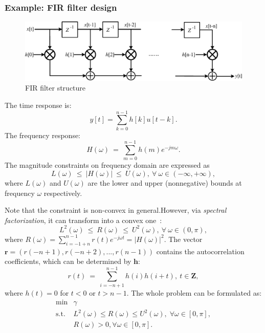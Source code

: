 \documentclass[final,leqno]{siamltex}
\begin{document}
\hypertarget{sec:example-fir-filter-design}{%
\subsubsection{Example: FIR filter design}\label{sec:example-fir-filter-design}}

\begin{figure}
\hypertarget{fig:fir_strctr}{%
\centering
\includegraphics{ellipsoid.files/fir_strctr.pdf}
\caption{FIR filter structure}\label{fig:fir_strctr}
}
\end{figure}

The time response is:
\[ y[t] = \sum_{k=0}^{n-1}{h[k]u[t-k]}.\]
The frequency response:
\[ H(\omega)~=~\sum_{m=0}^{n-1}{h(m)e^{-jm\omega}}.\]
The magnitude constraints on frequency domain are expressed as
\[ L(\omega)~\leq~|H(\omega)|~\leq~U(\omega),~\forall~\omega\in(-\infty,+\infty),\]
where \(L(\omega)\) and \(U(\omega)\) are the lower and upper (nonnegative) bounds at frequency \(\omega\) respectively.

Note that the constraint is non-convex in general.However, via \emph{spectral factorization}, it can transform into a convex one~\citep{wu1999fir}:
\[ L^2(\omega)~\leq~R(\omega)~\leq~U^2(\omega),~\forall~\omega\in(0,\pi),
\]
where \(R(\omega)=\sum_{i=-1+n}^{n-1}{r(t)e^{-j{\omega}t}}=|H(\omega)|^2\). The vector \(\mathbf{r}=(r(-n+1),r(-n+2),...,r(n-1))\) contains the autocorrelation coefficients, which can be determined by \(\mathbf{h}\):
\[ r(t)~=~\sum_{i=-n+1}^{n-1}{h(i)h(i+t)},~t\in\mathbf{Z},
\]
where \(h(t)=0\) for \(t < 0\) or \(t > n - 1\). The whole problem can be formulated as:
\[\begin{array}{ll}
      \text{min}  & \gamma \\
      \text{s.t.} & L^2(\omega) \leq R(\omega) \leq U^2(\omega), \; 
                                    \forall \omega \in [0,\pi],   \\
                  & R(\omega) > 0, \forall \omega \in [0,\pi].
  \end{array}
\]
\end{document}
